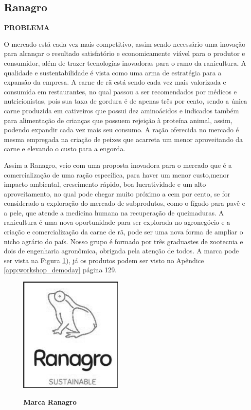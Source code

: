 \subsection{Ranagro}

\textbf{PROBLEMA}

O mercado está cada vez mais competitivo, assim sendo necessário uma inovação para alcançar o resultado satisfatório e economicamente viável para o produtor e consumidor, além de trazer tecnologias inovadoras para o ramo da ranicultura. A qualidade e sustentabilidade é vista como uma arma de estratégia para a expansão da empresa. A carne de rã está sendo cada vez mais valorizada e consumida em restaurantes, no qual passou a ser recomendados por médicos e nutricionistas, pois sua taxa de gordura é de apenas três por cento, sendo a única carne produzida em cativeiros que possui dez aminoácidos e indicados também para alimentação de crianças que possuem rejeição à proteína animal, assim, podendo expandir cada vez mais seu consumo. A ração oferecida no mercado é mesma empregada na criação de peixes que acarreta um menor aproveitando da carne e elevando o custo para a engorda.

Assim a Ranagro, veio com uma proposta inovadora para o mercado que é a comercialização de uma ração específica, para haver um menor custo,menor impacto ambiental, crescimento rápido, boa lucratividade e um alto aproveitamento, no qual pode chegar muito próximo a cem por cento, se for considerado a exploração do mercado de subprodutos, como o fígado para pavê e a pele, que atende a medicina humana na recuperação de queimaduras. A ranicultura é uma nova oportunidade para ser explorada no agronegócio e a criação e comercialização da carne de rã, pode ser uma nova forma de ampliar o nicho agrário do país. Nosso grupo é formado por três graduastes de zootecnia e dois de engenharia agronômica, obrigada pela atenção de todos. A marca pode ser vista na Figura \ref{figura_26}), já os produtos podem ser visto no Apêndice \ref{app:workshop_demoday} página 129.



\begin{figure}[H]
\centering
\caption{\textbf{Marca Ranagro}}
\includegraphics[scale=0.7]{Imagens/ranagro.png}
\label{figura_26}
\end{figure}



